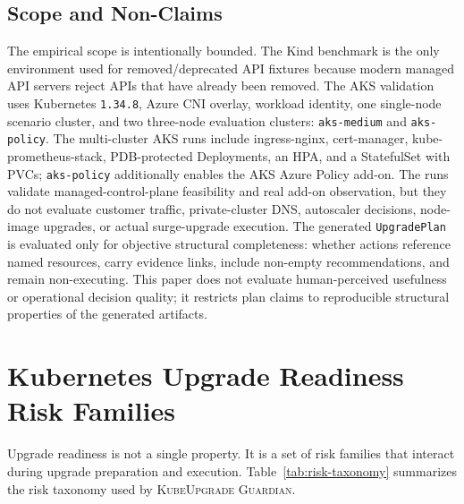 \documentclass[10pt,journal]{IEEEtran}
\newcommand{\tool}{\textsc{KubeUpgrade Guardian}}
\newcommand{\crd}[1]{\texttt{#1}}
\newcommand{\code}[1]{\texttt{#1}}
\begin{document}
\subsection{Scope and Non-Claims}
The empirical scope is intentionally bounded. The Kind benchmark is the only environment used for removed/deprecated API fixtures because modern managed API servers reject APIs that have already been removed. The AKS validation uses Kubernetes \code{1.34.8}, Azure CNI overlay, workload identity, one single-node scenario cluster, and two three-node evaluation clusters: \code{aks-medium} and \code{aks-policy}. The multi-cluster AKS runs include ingress-nginx, cert-manager, kube-prometheus-stack, PDB-protected Deployments, an HPA, and a StatefulSet with PVCs; \code{aks-policy} additionally enables the AKS Azure Policy add-on. The runs validate managed-control-plane feasibility and real add-on observation, but they do not evaluate customer traffic, private-cluster DNS, autoscaler decisions, node-image upgrades, or actual surge-upgrade execution. The generated \crd{UpgradePlan} is evaluated only for objective structural completeness: whether actions reference named resources, carry evidence links, include non-empty recommendations, and remain non-executing. This paper does not evaluate human-perceived usefulness or operational decision quality; it restricts plan claims to reproducible structural properties of the generated artifacts.

\section{Kubernetes Upgrade Readiness Risk Families}
Upgrade readiness is not a single property. It is a set of risk families that interact during upgrade preparation and execution. Table~\ref{tab:risk-taxonomy} summarizes the risk taxonomy used by \tool.
\end{document}
